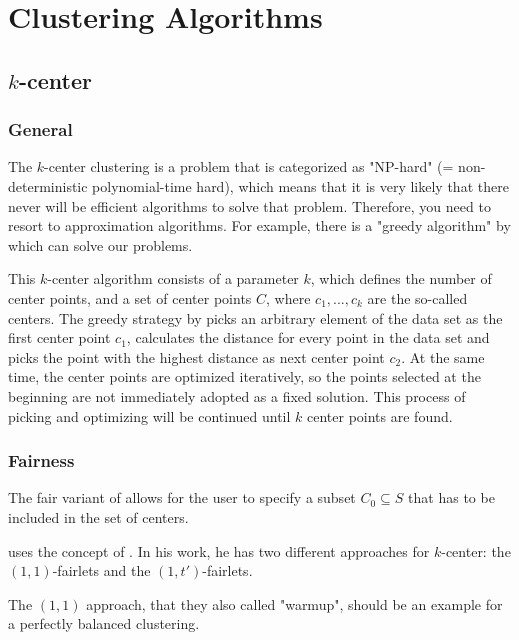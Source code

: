 \section{Clustering Algorithms}
\label{clustering-algorithms}


\subsection{$k$-center}
\label{k-center}

\subsubsection{General}
The $k$-center clustering is a problem that is categorized as "NP-hard" (= non-deterministic polynomial-time hard), which means that it is very likely that there never will be efficient algorithms to solve that problem. Therefore, you need to resort to approximation algorithms.
For example, there is a "greedy algorithm" by \textcite[]{Gonzalez1985ClusteringDistance} which can solve our problems.

This $k$-center algorithm consists of a parameter $k$, which defines the number of center points, and a set of center points $C$, where $c_{1},...,c_{k}$ are the so-called centers. \autocite[]{Kleindessner2019FairSummarization}
The greedy strategy by \textcite[]{Gonzalez1985ClusteringDistance} picks an arbitrary element of the data set as the first center point $c_{1}$, calculates the distance for every point in the data set and picks the point with the highest distance as next center point $c_{2}$. At the same time, the center points are optimized iteratively, so the points selected at the beginning are not immediately adopted as a fixed solution. This process of picking and optimizing will be continued until $k$ center points are found.

\subsubsection{Fairness}

The fair variant of \textcite[]{Kleindessner2019FairSummarization} allows for the user to specify a subset $C_{0} \subseteq S$ that has to be included in the set of centers.

\textcite[]{Chierichetti2018} uses the concept of . In his work, he has two different approaches for $k$-center: the $(1,1)$-fairlets and the $(1,t')$-fairlets.

The $(1,1)$ approach, that they also called "warmup", should be an example for a perfectly balanced clustering. \autocite[6]{Chierichetti2018}

